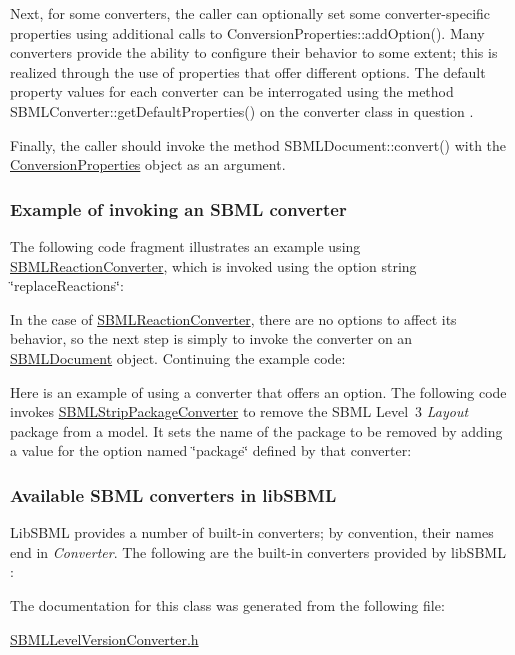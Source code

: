 Next, for some converters, the caller can optionally set some converter-\/specific properties using additional calls to Conversion\+Properties\+::add\+Option(). Many converters provide the ability to configure their behavior to some extent; this is realized through the use of properties that offer different options. The default property values for each converter can be interrogated using the method S\+B\+M\+L\+Converter\+::get\+Default\+Properties() on the converter class in question .

Finally, the caller should invoke the method S\+B\+M\+L\+Document\+::convert() with the \hyperlink{class_conversion_properties}{Conversion\+Properties} object as an argument.\hypertarget{classdoc__section__using__sbml__converters_converter-example}{}\subsubsection{Example of invoking an S\+B\+M\+L converter}\label{classdoc__section__using__sbml__converters_converter-example}
The following code fragment illustrates an example using \hyperlink{class_s_b_m_l_reaction_converter}{S\+B\+M\+L\+Reaction\+Converter}, which is invoked using the option string {\ttfamily \char`\"{}replace\+Reactions\char`\"{}}\+:

In the case of \hyperlink{class_s_b_m_l_reaction_converter}{S\+B\+M\+L\+Reaction\+Converter}, there are no options to affect its behavior, so the next step is simply to invoke the converter on an \hyperlink{class_s_b_m_l_document}{S\+B\+M\+L\+Document} object. Continuing the example code\+:

Here is an example of using a converter that offers an option. The following code invokes \hyperlink{class_s_b_m_l_strip_package_converter}{S\+B\+M\+L\+Strip\+Package\+Converter} to remove the S\+B\+ML Level~3 {\itshape Layout} package from a model. It sets the name of the package to be removed by adding a value for the option named {\ttfamily \char`\"{}package\char`\"{}} defined by that converter\+:\hypertarget{classdoc__section__using__sbml__converters_available-converters}{}\subsubsection{Available S\+B\+M\+L converters in lib\+S\+B\+ML}\label{classdoc__section__using__sbml__converters_available-converters}
Lib\+S\+B\+ML provides a number of built-\/in converters; by convention, their names end in {\itshape Converter}. The following are the built-\/in converters provided by lib\+S\+B\+ML \+:

The documentation for this class was generated from the following file\+:\begin{DoxyCompactItemize}
\item 
\hyperlink{_s_b_m_l_level_version_converter_8h}{S\+B\+M\+L\+Level\+Version\+Converter.\+h}\end{DoxyCompactItemize}
